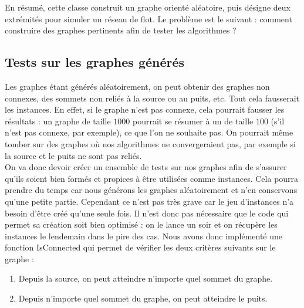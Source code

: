 \documentclass[a4paper]{article}
\begin{document}
En résumé, cette classe construit un graphe orienté aléatoire, puis désigne deux extrémités pour simuler un réseau de flot. Le problème est le suivant : comment construire des graphes pertinents afin de tester les algorithmes ? 

\subsection{Tests sur les graphes générés}
\label{sec:creer_instances}

Les graphes étant générés aléatoirement, on peut obtenir des graphes non connexes, des sommets non reliés à la source ou au puits, etc. Tout cela fausserait les instances. En effet, si le graphe n’est pas connexe, cela pourrait fausser les résultats : un graphe de taille $1000$ pourrait se résumer à un de taille $100$ (s'il n'est pas connexe, par exemple), ce que l’on ne souhaite pas. On pourrait même tomber sur des graphes où nos algorithmes ne convergeraient pas, par exemple si la source et le puits ne sont pas reliés.\\

On va donc devoir créer un ensemble de tests sur nos graphes afin de s’assurer qu’ils soient bien formés et propices à être utilisées comme instances. Cela pourra prendre du temps car nous générons les graphes aléatoirement et n’en conservons qu’une petite partie. Cependant ce n’est pas très grave car le jeu d’instances n’a besoin d’être créé qu’une seule fois. Il n’est donc pas nécessaire que le code qui permet sa création soit bien optimisé : on le lance un soir et on récupère les instances le lendemain dans le pire des cas.
Nous avons donc implémenté une fonction \textcolor{green!60!black}{IsConnected} qui permet de vérifier les deux critères suivants sur le graphe :
\begin{enumerate}
	\item Depuis la source, on peut atteindre n'importe quel sommet du graphe.
	\item Depuis n'importe quel sommet du graphe, on peut atteindre le puits.
\end{enumerate}
\end{document}
